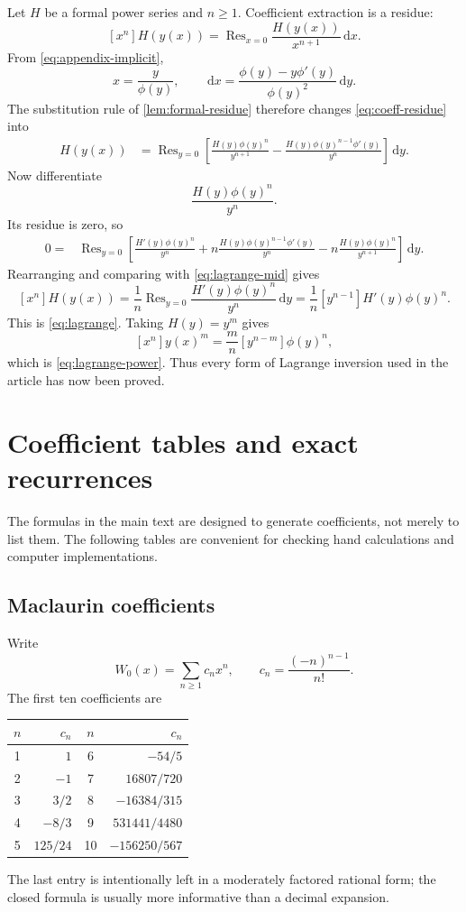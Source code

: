 \documentclass[11pt]{article}
\theoremstyle{remark}
\newcommand{\Res}{\operatorname{Res}}
\newcommand{\dd}{\,\mathrm d}
\begin{document}
Let \(H\) be a formal power series and \(n\geq1\).  Coefficient extraction
is a residue:
\begin{equation}\label{eq:coeff-residue}
       [x^n]H(y(x))
       =\Res_{x=0}\frac{H(y(x))}{x^{n+1}}\dd x.
\end{equation}
From \eqref{eq:appendix-implicit},
\[
       x=\frac{y}{\phi(y)},
       \qquad
       \dd x=\frac{\phi(y)-y\phi'(y)}{\phi(y)^2}\dd y.
\]
The substitution rule of \cref{lem:formal-residue} therefore changes
\eqref{eq:coeff-residue} into
\begin{align}
 [x^n]H(y(x))
 &=\Res_{y=0}
 \left[
 \frac{H(y)\phi(y)^n}{y^{n+1}}
 -\frac{H(y)\phi(y)^{n-1}\phi'(y)}{y^n}
 \right]\dd y.
 \label{eq:lagrange-mid}
\end{align}
Now differentiate
\[
       \frac{H(y)\phi(y)^n}{y^n}.
\]
Its residue is zero, so
\begin{align*}
 0={}&\Res_{y=0}\left[
 \frac{H'(y)\phi(y)^n}{y^n}
 +n\frac{H(y)\phi(y)^{n-1}\phi'(y)}{y^n}
 -n\frac{H(y)\phi(y)^n}{y^{n+1}}
 \right]\dd y.
\end{align*}
Rearranging and comparing with \eqref{eq:lagrange-mid} gives
\[
 [x^n]H(y(x))
 =\frac1n\Res_{y=0}
       \frac{H'(y)\phi(y)^n}{y^n}\dd y
 =\frac1n[y^{n-1}]H'(y)\phi(y)^n.
\]
This is \eqref{eq:lagrange}.  Taking \(H(y)=y^m\) gives
\[
 [x^n]y(x)^m
 =\frac{m}{n}[y^{n-m}]\phi(y)^n,
\]
which is \eqref{eq:lagrange-power}.  Thus every form of Lagrange inversion
used in the article has now been proved.

\section{Coefficient tables and exact recurrences}\label{app:coefficients}

The formulas in the main text are designed to generate coefficients, not
merely to list them.  The following tables are convenient for checking hand
calculations and computer implementations.

\subsection{Maclaurin coefficients}

Write
\[
       W_0(x)=\sum_{n\geq1}c_nx^n,
       \qquad c_n=\frac{(-n)^{n-1}}{n!}.
\]
The first ten coefficients are
\begin{center}
\begin{tabular}{@{}c r@{\qquad}c r@{}}
\toprule
\(n\)&\(c_n\)&\(n\)&\(c_n\)\\
\midrule
1&\(1\)&6&\(-54/5\)\\
2&\(-1\)&7&\(16807/720\)\\
3&\(3/2\)&8&\(-16384/315\)\\
4&\(-8/3\)&9&\(531441/4480\)\\
5&\(125/24\)&10&\(-156250/567\)\\
\bottomrule
\end{tabular}
\end{center}
The last entry is intentionally left in a moderately factored rational form;
the closed formula is usually more informative than a decimal expansion.
\end{document}
